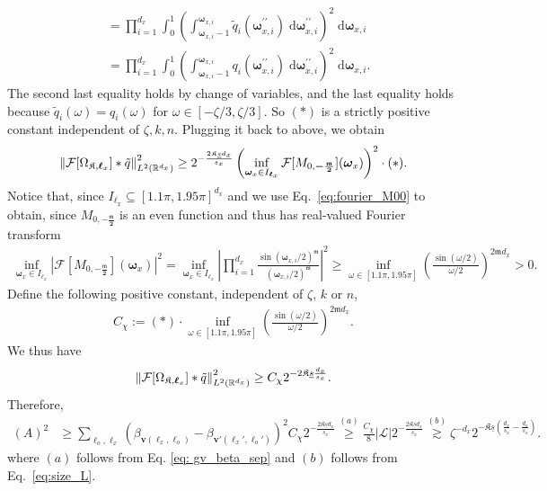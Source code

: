 \documentclass[11pt]{article}
\newcommand{\bv}{\mathbf v}
\newcommand{\bomega}{\boldsymbol{\omega}}
\newcommand{\calF}{\mathcal{F}}
\newcommand{\calL}{\mathcal{L}}
\newcommand{\bl}{{\boldsymbol\ell}}
\newcommand{\0}{\mathbf{0}}
\begin{document}
\begin{appendix}
\begin{align*}
    &= \prod_{i=1}^{d_x} \int_{0}^{1} \left( \int_{\bomega_{x, i}-1}^{\bomega_{x, i}} \tilde{q}_i\left( \bomega_{x, i}^{\prime\prime} \right) \;\mathrm{d}\bomega_{x, i}^{\prime\prime}  \right)^2 \;\mathrm{d}\bomega_{x, i} \\
    &= \prod_{i=1}^{d_x} \int_{0}^{1} \left( \int_{\bomega_{x, i}-1}^{\bomega_{x, i}} q_i\left( \bomega_{x, i}^{\prime\prime} \right) \;\mathrm{d}\bomega_{x, i}^{\prime\prime}  \right)^2 \;\mathrm{d}\bomega_{x, i}.
\end{align*}
The second last equality holds by change of variables, and the last equality holds because $\tilde{q}_i(\omega)=q_i(\omega)$ for $\omega \in [-\zeta/3, \zeta/3]$. 
So $(\ast)$ is a strictly positive constant independent of $\zeta, k, n$. Plugging it back to above, we obtain
\begin{align*}
    \left\|\calF[\Omega_{\mathfrak{K},\bl_x}] \ast \Tilde{q}\right\|_{L^2(\mathbb{R}^{d_x})}^2 \geq 2^{-\frac{2 \mathfrak{K}\underline{s}d_x}{s_x}} \left( \inf_{\bomega_x \in I_{\bl_x}} \calF[M_{0,\boldsymbol{-\frac{\mathfrak{m}}{2}}}](\bomega_x) \right)^2 \cdot (\ast). 
\end{align*}
Notice that, since $I_{\bl_x}\subseteq [1.1\pi, 1.95\pi]^{d_x}$ and we use Eq.~\eqref{eq:fourier_M00} to obtain, since $M_{0,\boldsymbol{-\frac{\mathfrak{m}}{2}}}$ is an even function and thus has real-valued Fourier transform
\begin{align*}
    \inf_{\bomega_x \in I_{\bl_x}} \left| \calF[M_{0,\boldsymbol{-\frac{\mathfrak{m}}{2}}}](\bomega_x) \right|^2 = \inf_{\bomega_x \in I_{\bl_x}} \left| \prod_{i=1}^{d_x} \frac{\sin(\bomega_{x,i}/2)^{\mathfrak{m}}}{ (\bomega_{x,i}/2)^{\mathfrak{m}}} \right|^2 \geq \inf_{\omega\in [1.1\pi, 1.95\pi]} \left( \frac{\sin(\omega/2)}{\omega/2} \right)^{2\mathfrak{m}d_x} > 0.
\end{align*}
Define the following positive constant, independent of $\zeta$, $k$ or $n$,
\begin{align}
\label{eq:lower_bound_c_chi_defi}
    C_{\chi} :=  (\ast) \cdot \inf_{\omega\in [1.1\pi, 1.95\pi]} \left( \frac{\sin(\omega/2)}{\omega/2} \right)^{2\mathfrak{m}d_x} .
\end{align}
We thus have
\begin{align}
    \label{eq:q_tilde_conv_lb}
    \left\|\calF[\Omega_{\mathfrak{K},\bl_x}] \ast \Tilde{q}\right\|_{L^2(\mathbb{R}^{d_x})}^2 \geq C_{\chi} 2^{-2\mathfrak{K}\underline{s}\frac{d_x}{s_x}}. 
\end{align}
Therefore,
\begin{align*}
    (A)^2 &\geq \sum_{\bl_o,\bl_x}(\beta_{\bv(\bl_x,\bl_o)} - \beta_{\bv'(\bl_x',\bl_o')})^2 C_{\chi}2^{-\frac{2\mathfrak{K}\underline{s}d_x}{s_x}} \stackrel{(a)}{\geq} \frac{C_{\chi}}{8}|\calL| 2^{-\frac{2\mathfrak{K}\underline{s}d_x}{s_x}} \stackrel{(b)}{\gtrsim} \zeta^{-d_x}2^{-\mathfrak{K}\underline{s}\left(\frac{d_x}{s_x} - \frac{d_o}{s_o}\right)}.
\end{align*}
where $(a)$ follows from Eq. \eqref{eq: gv_beta_sep} and $(b)$ follows from Eq.~\eqref{eq:size_L}.


\end{appendix}
\end{document}
